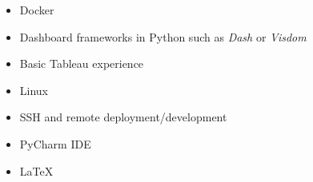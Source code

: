 
\begin{itemize}
\item Docker 

\end{itemize}

\begin{itemize}
\item Dashboard frameworks in Python such as \textit{Dash} or \textit{Visdom}
\item Basic Tableau experience

\end{itemize}

\begin{itemize}
\item Linux {\faLinux}
\item SSH and remote deployment/development
\item PyCharm IDE
\item \LaTeX
\end{itemize}

%
%






